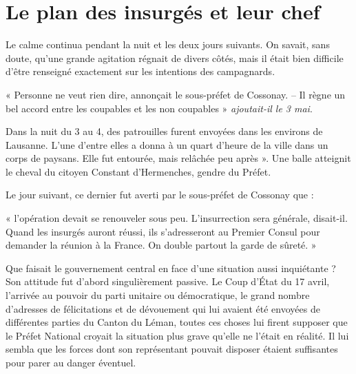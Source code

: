 \documentclass[french,twoside]{book} %
\newenvironment{quoteblock}%
  {\begin{quoting}}
  {\end{quoting}}
\newenvironment{quotebar}{%
    \def\FrameCommand{{\color{rubric!10!}\vrule width 0.5em} \hspace{0.9em}}%
    \def\OuterFrameSep{\itemsep} %
    \MakeFramed {\advance\hsize-\width \FrameRestore}
  }%
  {%
    \endMakeFramed
  }
\renewenvironment{quoteblock}%
  {%
    \savenotes
    \setstretch{0.9}
    \begin{quotebar}
  }
  {%
    \end{quotebar}
    \spewnotes
  }
\begin{document}
\section[Le plan des insurgés et leur chef]{Le plan des insurgés et leur chef}
\noindent Le calme continua pendant la nuit et les deux jours suivants. On savait, sans doute, qu’une grande agitation régnait de divers côtés, mais il était bien difficile d’être renseigné exactement sur les intentions des campagnards.\par

\begin{quoteblock}
\noindent « Personne ne veut rien dire, annonçait le sous-préfet de Cossonay. – Il règne un bel accord entre les coupables et les non coupables » \emph{ajoutait-il le 3 mai}.\end{quoteblock}

\noindent Dans la nuit du 3 au 4, des patrouilles furent envoyées dans les environs de Lausanne. L’une d’entre elles a donna à un quart d’heure de la ville dans un corps de paysans. Elle fut entourée, mais relâchée peu après ». Une balle atteignit le cheval du citoyen Constant d’Hermenches, gendre du Préfet.\par
Le jour suivant, ce dernier fut averti par le sous-préfet de Cossonay que :\par

\begin{quoteblock}
\noindent « l’opération devait se renouveler sous peu. L’insurrection sera générale, disait-il. Quand les insurgés auront réussi, ils s’adresseront au Premier Consul pour demander la réunion à la France. On double partout la garde de sûreté. »\end{quoteblock}

\noindent Que faisait le gouvernement central en face d’une situation aussi inquiétante ? Son attitude fut d’abord singulièrement passive. Le Coup d’État du 17 avril, l’arrivée au pouvoir du parti unitaire ou démocratique, le grand nombre d’adresses de félicitations et de dévouement qui lui avaient été envoyées de différentes parties du Canton du Léman, toutes ces choses lui firent supposer que le Préfet National croyait la situation plus grave qu’elle ne l’était en réalité. Il lui sembla que les forces dont son représentant pouvait disposer étaient suffisantes pour parer au danger éventuel.\par
\end{document}
